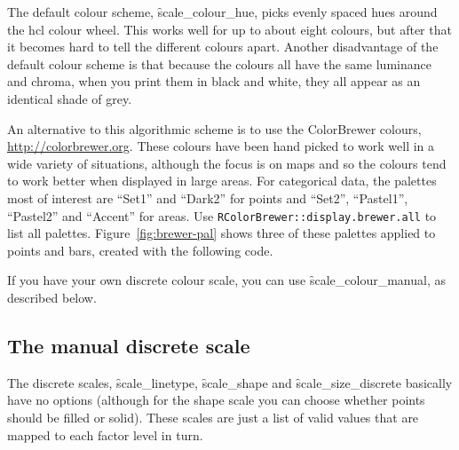 The default colour scheme, \f{scale_colour_hue}, picks evenly spaced hues around the hcl colour wheel.  This works well for up to about eight colours, but after that it becomes hard to tell the different colours apart.  Another disadvantage of the default colour scheme is that because the colours all have the same luminance and chroma, when you print them in black and white, they all appear as an identical shade of grey.

An alternative to this algorithmic scheme is to use the ColorBrewer colours, \url{http://colorbrewer.org}. These colours have been hand picked to work well in a wide variety of situations, although the focus is on maps and so the colours tend to work better when displayed in large areas. For categorical data, the palettes most of interest are ``Set1'' and ``Dark2'' for points and ``Set2'', ``Pastel1'', ``Pastel2'' and ``Accent'' for areas. Use {\tt RColorBrewer::display.brewer.all} to list all palettes. Figure~\ref{fig:brewer-pal} shows three of these palettes applied to points and bars, created with the following code.

% 
% 


If you have your own discrete colour scale, you can use \f{scale_colour_manual}, as described below.

\subsection{The manual discrete scale}
\label{sub:scale-manual}

The discrete scales, \f{scale_linetype}, \f{scale_shape} and \f{scale_size_discrete} basically have no options (although for the shape scale you can choose whether points should be filled or solid). These scales are just a list of valid values that are mapped to each factor level in turn.

